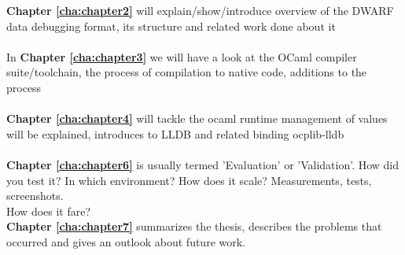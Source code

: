 \textbf{Chapter \ref{cha:chapter2}} will explain/show/introduce overview of the DWARF data debugging format, its structure and related work done about it
\\
\\
In \textbf{Chapter \ref{cha:chapter3}} we will have a look at the OCaml compiler suite/toolchain, the process of compilation to native code, additions to the process
\\
\\
\textbf{Chapter \ref{cha:chapter4}} will tackle the ocaml runtime management of values will be explained, introduces to LLDB and related binding ocplib-lldb
\\
\\
\textbf{Chapter \ref{cha:chapter6}} is usually termed 'Evaluation' or 'Validation'. How did you test it? In which environment? How does it scale? Measurements, tests, screenshots.
\\
How does it fare?
\\
\textbf{Chapter \ref{cha:chapter7}} summarizes the thesis, describes the problems that occurred and gives an outlook about future work.


